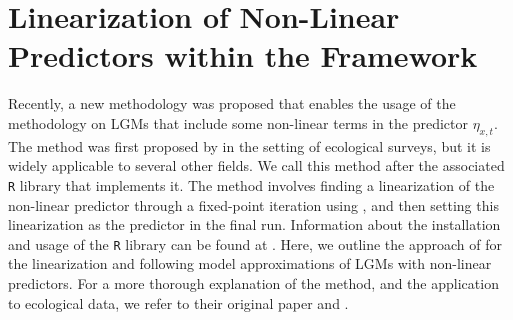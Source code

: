 \newpage
\section{Linearization of Non-Linear Predictors within the \inla Framework}
\label{sec:inlabru}

Recently, a new methodology was proposed that enables the usage of the \inla methodology on LGMs that include some non-linear terms in the predictor $\eta_{x,t}$. The method was first proposed by \textcite{BachlLindgren2019} in the setting of ecological surveys, but it is widely applicable to several other fields. We call this method \inlabru after the associated \texttt{R} library that implements it. The \inlabru method involves finding a linearization of the non-linear predictor through a fixed-point iteration using \inla, and then setting this linearization as the predictor in the final \inla run. Information about the installation and usage of the \inlabru \texttt{R} library can be found at \textcite{Inlabru}. Here, we outline the approach of \textcite{BachlLindgren2019} for the linearization and following model approximations of LGMs with non-linear predictors. For a more thorough explanation of the method, and the application to ecological data, we refer to their original paper \parencite{BachlLindgren2019} and \textcite{Inlabru}.

